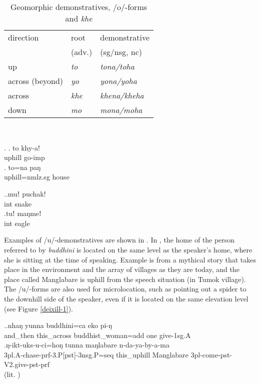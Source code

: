 \begin{table}[htp]
\begin{centering}
\begin{tabular}{lll}
\toprule
 {\sc direction} & {\sc root } & {\sc demonstrative} \\
  &(adv.) & ({\sc sg/nsg, nc})\\
\midrule
{\sc up}&\emph{to} &\emph{tona/toha} \\
{\sc across (beyond)}&\emph{yo} &\emph{yona/yoha} \\
{\sc across }&\emph{khe}&\emph{khena/kheha} \\
{\sc down}&\emph{mo} &\emph{mona/moha} \\
\bottomrule
\end{tabular}\\
\caption{Geomorphic demonstratives,  /o/-forms and  \emph{khe} }\label{motoyo}
\end{centering}
\end{table}


\ex. \ag. to khy-a!\\
uphill go{\sc -imp}\\
\bg. to=na paŋ\\
uphill{\sc =nmlz.sg} house\\


\ex.\ag.muǃ puchak!\\
{\sc int} snake\\
\bg.tuǃ maŋmeǃ\\
{\sc int} eagle\\


Examples of /u/-demonstratives are shown in \Next.  In \Next[a], the home of the person referred to by \emph{buddhini} is located on the same level as the speaker's home, where she is sitting at the time of speaking. Example \Next[b] is from a mythical story that takes place in the environment and the array of villages as they are today, and the place called Manglabare is uphill from the speech situation (in Tumok village). The /u/-forms are also used for microlocation, such as pointing out a spider to the downhill side of the speaker, even if it is located on the same elevation level (see Figure  \ref{deixill-1}).

\ex.\ag.nhaŋ    yunna              buddhini=ca        eko pi-ŋ\\
and\_then this\_across buddhist\_woman{\sc =add} one give{\sc [pst]-1sg.A}\\
\bg.ŋ-ikt-uks-u-ci=hoŋ   tunna    maŋlabare n-da-ya-by-a-ma	\\
{\sc 3pl.A-}chase{\sc -prf-3.P[pst]-3nsg.P=seq} this\_uphill Manglabare {\sc 3pl-}come{\sc -pst-V2.give-pst-prf}\\
 (lit. ) 	



